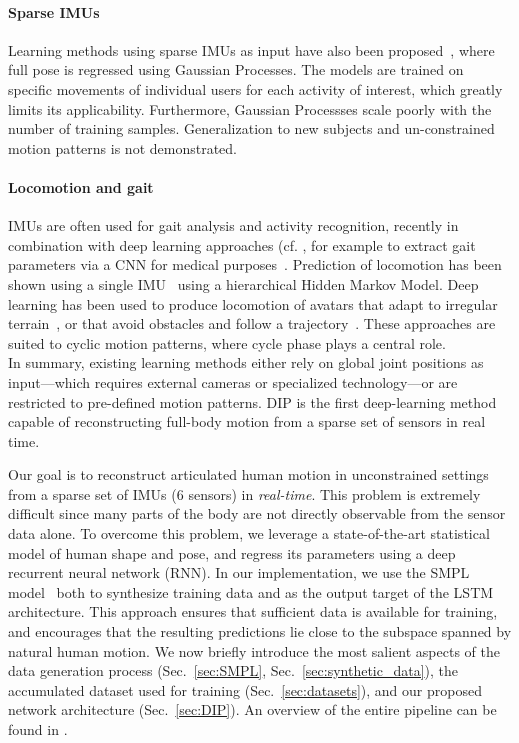 \documentclass[acmtog]{acmart}
\begin{document}
\paragraph{Sparse IMUs} Learning methods using sparse IMUs as input have also been proposed~\cite{schwarz2009discriminative}, where full pose is regressed using Gaussian Processes. The models are trained on specific movements of individual users for each activity of interest, which greatly limits its applicability. Furthermore, Gaussian Processses scale poorly with the number of training samples. Generalization to new subjects and un-constrained motion patterns is not demonstrated. 

\paragraph{Locomotion and gait}
IMUs are often used for gait analysis and activity recognition, recently  in combination with deep learning approaches (cf. \cite{wang2017deep}, for example to extract gait parameters via a CNN for medical purposes~\cite{hannink2016sensor}. 
Prediction of locomotion has been shown using a single IMU~\cite{oneIMU} using a hierarchical Hidden Markov Model. Deep learning has been used to produce locomotion of avatars that adapt to irregular terrain~\cite{holden2017phase}, or that avoid obstacles and follow a trajectory~\cite{deepLoco}. These approaches are suited to cyclic motion patterns, where cycle phase plays a central role. \\ 

In summary, existing learning methods either rely on global joint positions as input---which requires external cameras or specialized technology---or are restricted to pre-defined motion patterns. DIP is the first deep-learning method capable of reconstructing full-body motion from a sparse set of sensors in real time. 

Our goal is to reconstruct articulated human motion in unconstrained settings from a sparse set of IMUs (6 sensors) in \emph{real-time}. This problem is extremely difficult since many parts of the body are not directly observable from the sensor data alone. To overcome this problem, we leverage a state-of-the-art statistical model of human shape and pose, and regress its parameters using a deep recurrent neural network (RNN). In our implementation, we use the SMPL model~\cite{loper2015smpl} both to synthesize training data and as the output target of the LSTM architecture. This approach ensures that sufficient data is available for training, and encourages that the resulting predictions lie close to the subspace spanned by natural human motion. We now briefly introduce the most salient aspects of the data generation process (Sec.~\ref{sec:SMPL}, Sec.~\ref{sec:synthetic_data}), the accumulated dataset used for training (Sec.~\ref{sec:datasets}), and our proposed network architecture (Sec.~\ref{sec:DIP}). An overview of the entire pipeline can be found in . 
\end{document}
